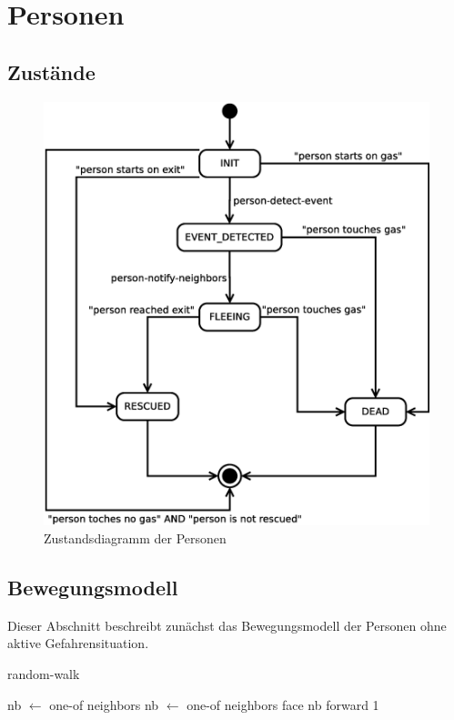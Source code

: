 \section{Personen}
\label{sec:personen}

\subsection{Zustände}


\begin{figure}
\centering
\includegraphics[height=0.6\textwidth]{simulationsumgebung/person.eps}
\caption{Zustandsdiagramm der Personen}
\label{fig:person}
\end{figure}

\subsection{Bewegungsmodell}
\label{sec:bewegungsmodell}

Dieser Abschnitt beschreibt zunächst das Bewegungsmodell der Personen ohne aktive Gefahrensituation.

\begin{algorithm}
\caption{random-walk}
\begin{algorithmic} 
\STATE nb $\leftarrow$ one-of neighbors
\STATE nb $\leftarrow$ one-of neighbors 
\ENDWHILE
\STATE face nb
\STATE forward 1
\end{algorithmic}
\end{algorithm}


